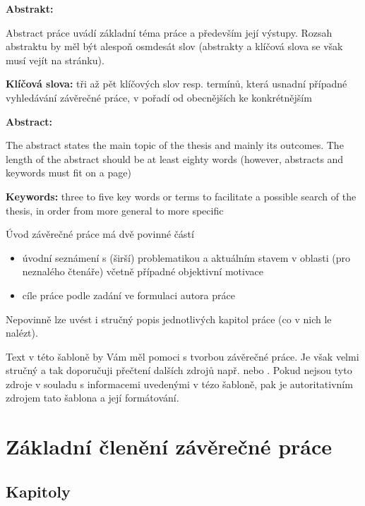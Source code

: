 \documentclass[male,czech,api_bc]{kitheses}
\newcommand{\ZT}[1]{\colorbox{yellow}{\color{red}{#1}}}
\newcommand{\nazeven}{\ZT{Thesis on KI PřF}}     %
\begin{document}
\textbf{Abstrakt:}

Abstract práce uvádí základní téma práce a především její výstupy. Rozsah abstraktu by měl být alespoň osmdesát slov (abstrakty a klíčová slova se však musí vejít na stránku).

\textbf{Klíčová slova:} tři až pět klíčových slov resp. termínů, která usnadní případné vyhledávání závěrečné práce, v pořadí od obecnějších ke konkrétnějším

\bigskip


\textsc{\nazeven}

\textbf{Abstract:}

The abstract states the main topic of the thesis and mainly its outcomes. The length of the abstract should be at least eighty words (however, abstracts and keywords must fit on a page)

\textbf{Keywords:} three to five key words or terms to facilitate a possible search of the thesis, in order from more general to more specific

\tableofcontents


Úvod závěrečné práce má dvě povinné částí

\begin{itemize}
\item úvodní seznámení s (širší) problematikou a aktuálním stavem v oblasti (pro neznalého čtenáře) včetně případné objektivní motivace 
\item cíle práce podle zadání ve formulaci autora práce
\end{itemize}

Nepovinně lze uvést i stručný popis jednotlivých kapitol práce (co v nich le nalézt).

Text v této šabloně by Vám měl pomoci s tvorbou závěrečné práce. Je však velmi stručný a tak doporučuji přečtení dalších zdrojů např. \cite{Katuscakc2008} nebo 
\cite{Ticha2009}. Pokud nejsou tyto zdroje v souladu s informacemi uvedenými v tézo šabloně, pak je autoritativním zdrojem tato šablona a její formátování.

\chapter{Základní členění závěrečné práce}

\section{Kapitoly}
\end{document}
